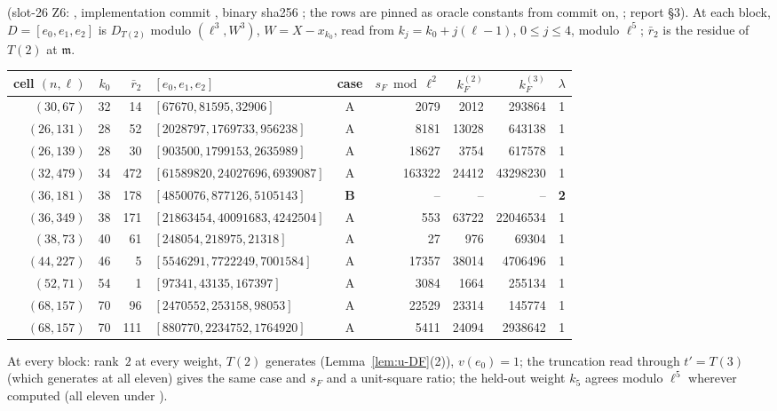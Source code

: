 \documentclass[11pt]{article}
\begin{document}
\begin{remark}\label{rmk:u-H2data}
\COMP{} (slot-26 Z6: , implementation commit , binary sha256 ; the rows are pinned as oracle
constants from commit  on, ; report  \S3). At each block, $D=[e_0,e_1,e_2]$ is $D_{T(2)}$ modulo
$(\ell^{3},W^{3})$, $W=X-x_{k_0}$, read from $k_j=k_0+j(\ell-1)$, $0\le j\le4$, modulo $\ell^{5}$; $\bar r_2$ is the residue of $T(2)$ at $\mathfrak m$.
\begin{center}\small
\begin{tabular}{rrrlcrrrc}
cell $(n,\ell)$ & $k_0$ & $\bar r_2$ & $[e_0,e_1,e_2]$ & case & $s_F\bmod\ell^{2}$ & $k^{(2)}_F$ & $k^{(3)}_F$ & $\lambda$\\\hline
$(30,67)$ & 32 & 14 & $[67670,81595,32906]$ & A & 2079 & 2012 & 293864 & 1\\
$(26,131)$ & 28 & 52 & $[2028797,1769733,956238]$ & A & 8181 & 13028 & 643138 & 1\\
$(26,139)$ & 28 & 30 & $[903500,1799153,2635989]$ & A & 18627 & 3754 & 617578 & 1\\
$(32,479)$ & 34 & 472 & $[61589820,24027696,6939087]$ & A & 163322 & 24412 & 43298230 & 1\\
$(36,181)$ & 38 & 178 & $[4850076,877126,5105143]$ & \textbf{B} & -- & -- & -- & \textbf{2}\\
$(36,349)$ & 38 & 171 & $[21863454,40091683,4242504]$ & A & 553 & 63722 & 22046534 & 1\\
$(38,73)$ & 40 & 61 & $[248054,218975,21318]$ & A & 27 & 976 & 69304 & 1\\
$(44,227)$ & 46 & 5 & $[5546291,7722249,7001584]$ & A & 17357 & 38014 & 4706496 & 1\\
$(52,71)$ & 54 & 1 & $[97341,43135,167397]$ & A & 3084 & 1664 & 255134 & 1\\
$(68,157)$ & 70 & 96 & $[2470552,253158,98053]$ & A & 22529 & 23314 & 145774 & 1\\
$(68,157)$ & 70 & 111 & $[880770,2234752,1764920]$ & A & 5411 & 24094 & 2938642 & 1\\
\end{tabular}
\end{center}
At every block: rank~$2$ at every weight, $T(2)$ generates (Lemma~\ref{lem:u-DF}(2)), $v(e_0)=1$; the truncation read through $t'=T(3)$ (which generates at all eleven) gives
the same case and $s_F$ and a unit-square ratio; the held-out weight $k_5$ agrees modulo $\ell^{5}$ wherever computed (all eleven under ).

\end{remark}
\end{document}
